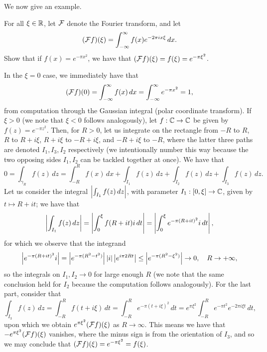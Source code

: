 \newpage
\noindent We now give an example.
\begin{problem}
    For all $\xi \in \mathbb R$, let $\mathcal F$ denote the Fourier transform, and let
    \[ (\mathcal F f)(\xi) = \int_{-\infty}^\infty f(x) e^{-2\pi i x \xi} \, dx. \]
    Show that if $f(x) = e^{-\pi x^2}$, we have that $(\mathcal F f)(\xi) = f(\xi) = e^{-\pi \xi^2}$.
\end{problem}
\begin{solution}
    In the $\xi = 0$ case, we immediately have that
    \[ (\mathcal F f)(0) = \int_{-\infty}^\infty f(x) \, dx = \int_{-\infty}^\infty e^{-\pi x^2} = 1, \]
    from computation through the Gaussian integral (polar coordinate transform). If $\xi > 0$ (we note that $\xi < 0$ follows analogously), let $f : \mathbb C \to \mathbb C$ be given by $f(z) = e^{-\pi z^2}$. Then, for $R > 0$, let us integrate on the rectangle from $-R$ to $R$, $R$ to $R + i\xi$, $R + i\xi$ to $-R + i\xi$, and $-R + i\xi$ to $-R$, where the latter three paths are denoted $I_1, I_3, I_2$ respectively (we intentionally number this way because the two opposing sides $I_1, I_2$ can be tackled together at once). We have that
    \[ 0 = \int_{\gamma_R} f(z) \, dz = \int_{-R}^R f(x) \, dx + \int_{I_1} f(z) \, dz + \int_{I_2} f(z) \, dz + \int_{I_3} f(z) \, dz. \]
    Let us consider the integral $\left\lvert \int_{I_1} f(z) \, dz \right\rvert$, with parameter $I_1 : [0, \xi] \to \mathbb C$, given by $t \mapsto R + it$; we have that
    \[ \left\lvert \int_{I_1} f(z) \, dz \right\rvert = \left\lvert \int_0^\xi f(R + it) i \, dt \right\rvert = \left\lvert \int_0^\xi e^{-\pi(R + it)^2} i \, dt \right\rvert, \]
    for which we observe that the integrand
    \[ \left\lvert e^{-\pi(R+it)^2} i \right\rvert = \left\lvert e^{-\pi(R^2 - t^2)} \right\rvert \left\lvert i \right\rvert \left\lvert e^{i \pi 2 Rt} \right\rvert \leq \left\lvert e^{-\pi(R^2 - \xi^2)} \right\rvert \to 0, \quad R \to +\infty, \]
    so the integrals on $I_1, I_2 \to 0$ for large enough $R$ (we note that the same conclusion held for $I_2$ because the computation follows analogously). For the last part, consider that
    \[ \int_{I_3} f(z) \, dz = \int_{-R}^R f(t + i\xi) \, dt = \int_{-R}^R e^{-\pi(t + i\xi)^2} \, dt = e^{\pi \xi^2} \int_{-R}^R e^{-\pi t^2} e^{-2 \pi i \xi t} \, dt, \]
    upon which we obtain $e^{\pi \xi^2} (\mathcal F f)(\xi)$ as $R \to \infty$. This means we have that $-e^{\pi \xi^2} (\mathcal F f)(\xi)$ vanishes, where the minus sign is from the orientation of $I_3$, and so we may conclude that $(\mathcal F f)(\xi) = e^{-\pi \xi^2} = f(\xi)$.
\end{solution}